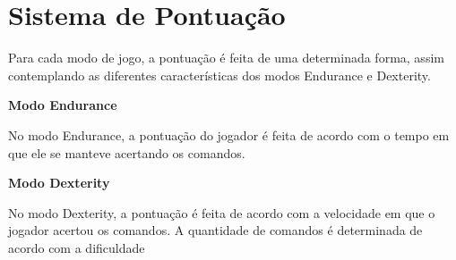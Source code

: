 \section{Sistema de Pontuação}

Para cada modo de jogo, a pontuação é feita de uma determinada forma, assim contemplando as diferentes características dos modos Endurance e Dexterity.

\textbf{Modo Endurance}

No modo Endurance, a pontuação do jogador é feita de acordo com o tempo em que ele se manteve acertando os comandos.

\textbf{Modo Dexterity}

No modo Dexterity, a pontuação é feita de acordo com a velocidade em que o jogador acertou os comandos. A quantidade de comandos é determinada de acordo com a dificuldade